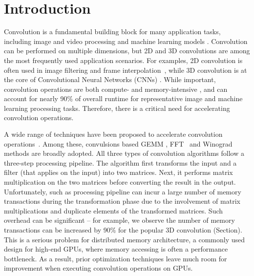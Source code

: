 \section{Introduction}
Convolution is a fundamental building block for many application tasks, including image and video processing and machine learning
models \cite{Perrot2014Fine,Ma2014Optimized,Rudi2015Image,Niklaus2017Video,Krizhevsky2012ImageNet,SimonyanZ14a,HeZRS16,SzegedyLJSRAEVR15}. Convolution can be performed on multiple dimensions, but 2D and 3D convolutions are among the most frequently used
application scenarios. For examples, 2D convolution is often used in image filtering and frame
interpolation~\cite{Perrot2014Fine,Ma2014Optimized,Rudi2015Image,Niklaus2017Video}, while 3D convolution is at the core of Convolutional
Neural Networks (CNNs) \cite{Krizhevsky2012ImageNet,SimonyanZ14a,HeZRS16,SzegedyLJSRAEVR15}. While important, convolution operations are both compute- and memory-intensive \cite{cavigelli2015accelerating},
and can account for nearly 90\% of overall runtime \cite{Li2016Performance} for representative image and machine learning processing tasks.
Therefore, there is a critical need for accelerating convolution operations.


A wide range of techniques have been proposed to accelerate convolution
operations~\cite{Iandola2014Communication,vasilache2014fast,lavin2016fast,cho2017mec,Zhen2018Optimizing,Vasudevan2017Parallel,Chellapilla2006High}.
Among these, convulsions based GEMM \cite{Vasudevan2017Parallel,Chellapilla2006High}, FFT~\cite{vasilache2014fast} and
Winograd~\cite{lavin2016fast} methods are broadly adopted. All three types of convolution algorithms follow a
three-step processing pipeline. The algorithm first transforms the input and a filter (that applies on the input) into
two matrices. Next, it performs matrix multiplication on the two matrices before converting the result in the output.
Unfortunately, such as processing pipeline can incur a large number of memory transactions during the transformation
phase due to the involvement of matrix multiplications and duplicate elements of the transformed matrices. Such
overhead can be significant – for example, we observe the number of memory transactions can be increased by 90\% for
the popular 3D convolution (Section\FIXME{\ref{}}). This is a serious problem for distributed memory architecture, a
commonly used design for high-end GPUs, where memory accessing is often a performance bottleneck. As a result, prior
optimization techniques leave much room for improvement when executing convolution operations on GPUs.


